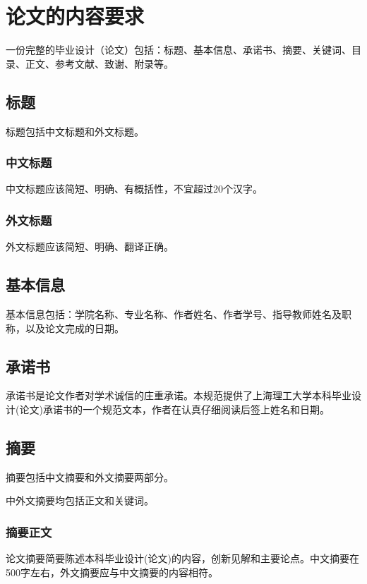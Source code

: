 \chapter{论文的内容要求}
\label{chap:contents}
\par {\bSong 一份完整的毕业设计（论文）包括：标题、基本信息、承诺书、摘要、关键词、目录、正文、参考文献、致谢、附录等。}

\section{标题}
\par 标题包括中文标题和外文标题。

\subsection{中文标题}
\par 中文标题应该简短、明确、有概括性，不宜超过20个汉字。

\subsection{外文标题}
\par 外文标题应该简短、明确、翻译正确。

\section{基本信息}
\par 基本信息包括：学院名称、专业名称、作者姓名、作者学号、指导教师姓名及职称，以及论文完成的日期。

\section{承诺书}
\par 承诺书是论文作者对学术诚信的庄重承诺。本规范提供了上海理工大学本科毕业设计(论文)承诺书的一个规范文本，作者在认真仔细阅读后签上姓名和日期。

\section{摘要}
\par 摘要包括中文摘要和外文摘要两部分。
\par 中外文摘要均包括正文和关键词。

\subsection{摘要正文}
\par 论文摘要简要陈述本科毕业设计(论文)的内容，创新见解和主要论点。中文摘要在500字左右，外文摘要应与中文摘要的内容相符。

